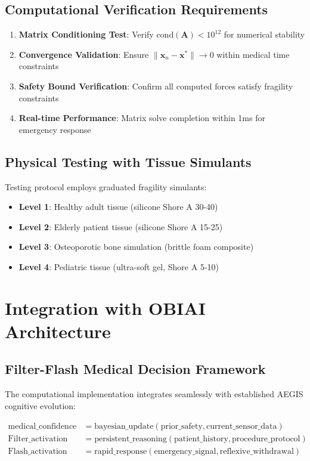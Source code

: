 \documentclass[11pt]{article}
\begin{document}
\subsection{Computational Verification Requirements}

\begin{enumerate}
\item \textbf{Matrix Conditioning Test}: Verify $\text{cond}(\mathbf{A}) < 10^{12}$ for numerical stability
\item \textbf{Convergence Validation}: Ensure $\|\mathbf{x}_n - \mathbf{x}^*\| \rightarrow 0$ within medical time constraints
\item \textbf{Safety Bound Verification}: Confirm all computed forces satisfy fragility constraints
\item \textbf{Real-time Performance}: Matrix solve completion within 1ms for emergency response
\end{enumerate}

\subsection{Physical Testing with Tissue Simulants}

Testing protocol employs graduated fragility simulants:

\begin{itemize}
\item \textbf{Level 1}: Healthy adult tissue (silicone Shore A 30-40)
\item \textbf{Level 2}: Elderly patient tissue (silicone Shore A 15-25)  
\item \textbf{Level 3}: Osteoporotic bone simulation (brittle foam composite)
\item \textbf{Level 4}: Pediatric tissue (ultra-soft gel, Shore A 5-10)
\end{itemize}

\section{Integration with OBIAI Architecture}

\subsection{Filter-Flash Medical Decision Framework}

The computational implementation integrates seamlessly with established AEGIS cognitive evolution:

\begin{align}
\text{medical\_confidence} &= \text{bayesian\_update}(\text{prior\_safety}, \text{current\_sensor\_data}) \\
\text{Filter\_activation} &= \text{persistent\_reasoning}(\text{patient\_history}, \text{procedure\_protocol}) \\
\text{Flash\_activation} &= \text{rapid\_response}(\text{emergency\_signal}, \text{reflexive\_withdrawal})
\end{align}
\end{document}
